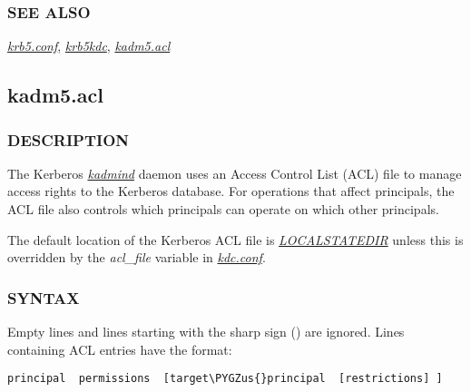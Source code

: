 \documentclass[letterpaper,10pt,english]{sphinxmanual}
\def\PYGZus{\char`\_}
\begin{document}
\subsubsection{SEE ALSO}
\label{admin/conf_files/kdc_conf:see-also}
{\hyperref[admin/conf_files/krb5_conf:krb5-conf-5]{\emph{krb5.conf}}}, {\hyperref[admin/admin_commands/krb5kdc:krb5kdc-8]{\emph{krb5kdc}}}, {\hyperref[admin/conf_files/kadm5_acl:kadm5-acl-5]{\emph{kadm5.acl}}}


\subsection{kadm5.acl}
\label{admin/conf_files/kadm5_acl:kadm5-acl}\label{admin/conf_files/kadm5_acl:kadm5-acl-5}\label{admin/conf_files/kadm5_acl::doc}

\subsubsection{DESCRIPTION}
\label{admin/conf_files/kadm5_acl:description}
The Kerberos {\hyperref[admin/admin_commands/kadmind:kadmind-8]{\emph{kadmind}}} daemon uses an Access Control List
(ACL) file to manage access rights to the Kerberos database.
For operations that affect principals, the ACL file also controls
which principals can operate on which other principals.

The default location of the Kerberos ACL file is
{\hyperref[mitK5defaults:paths]{\emph{LOCALSTATEDIR}}}  unless this is overridden by the \emph{acl\_file}
variable in {\hyperref[admin/conf_files/kdc_conf:kdc-conf-5]{\emph{kdc.conf}}}.


\subsubsection{SYNTAX}
\label{admin/conf_files/kadm5_acl:syntax}
Empty lines and lines starting with the sharp sign (\code{\#}) are
ignored.  Lines containing ACL entries have the format:

\begin{Verbatim}[commandchars=\\\{\}]
principal  permissions  [target\PYGZus{}principal  [restrictions] ]
\end{Verbatim}
\end{document}
